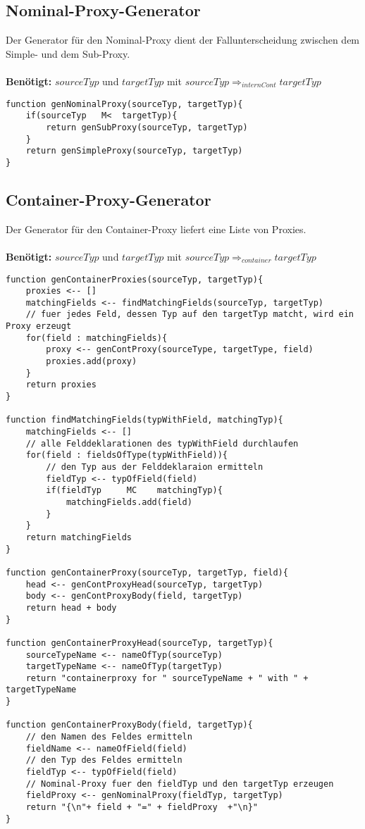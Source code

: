 \documentclass[a4paper,12pt]{article}
\begin{document}
\subsection{Nominal-Proxy-Generator}
Der Generator für den Nominal-Proxy dient der Fallunterscheidung zwischen dem Simple- und dem Sub-Proxy.\\\\
\textbf{Benötigt: }$sourceTyp$ und $targetTyp$ mit $sourceTyp \Rightarrow_{internCont} targetTyp$
\begin{lstlisting}[style = generator]
function genNominalProxy(sourceTyp, targetTyp){
	if(sourceTyp   M<  targetTyp){
		return genSubProxy(sourceTyp, targetTyp)
	}
	return genSimpleProxy(sourceTyp, targetTyp)
}
\end{lstlisting}

\subsection{Container-Proxy-Generator}
Der Generator für den Container-Proxy liefert eine Liste von Proxies.\\\\
\textbf{Benötigt: }$sourceTyp$ und $targetTyp$ mit $sourceTyp \Rightarrow_{container} targetTyp$
\begin{lstlisting}[style = generator]
function genContainerProxies(sourceTyp, targetTyp){
	proxies <-- []
	matchingFields <-- findMatchingFields(sourceTyp, targetTyp)
	// fuer jedes Feld, dessen Typ auf den targetTyp matcht, wird ein Proxy erzeugt
	for(field : matchingFields){
		proxy <-- genContProxy(sourceType, targetType, field)
		proxies.add(proxy)
	}
	return proxies
}

function findMatchingFields(typWithField, matchingTyp){
	matchingFields <-- []
	// alle Felddeklarationen des typWithField durchlaufen 	
	for(field : fieldsOfType(typWithField)){
		// den Typ aus der Felddeklaraion ermitteln
		fieldTyp <-- typOfField(field)
		if(fieldTyp     MC    matchingTyp){
			matchingFields.add(field)
		}
	}	
	return matchingFields
}

function genContainerProxy(sourceTyp, targetTyp, field){
	head <-- genContProxyHead(sourceTyp, targetTyp)
	body <-- genContProxyBody(field, targetTyp)
	return head + body
}

function genContainerProxyHead(sourceTyp, targetTyp){
	sourceTypeName <-- nameOfTyp(sourceTyp)
	targetTypeName <-- nameOfTyp(targetTyp)
	return "containerproxy for " sourceTypeName + " with " + targetTypeName
}

function genContainerProxyBody(field, targetTyp){
	// den Namen des Feldes ermitteln	
	fieldName <-- nameOfField(field)
	// den Typ des Feldes ermitteln
	fieldTyp <-- typOfField(field)
	// Nominal-Proxy fuer den fieldTyp und den targetTyp erzeugen
	fieldProxy <-- genNominalProxy(fieldTyp, targetTyp)
	return "{\n"+ field + "=" + fieldProxy  +"\n}"
}
\end{lstlisting}
\end{document}

